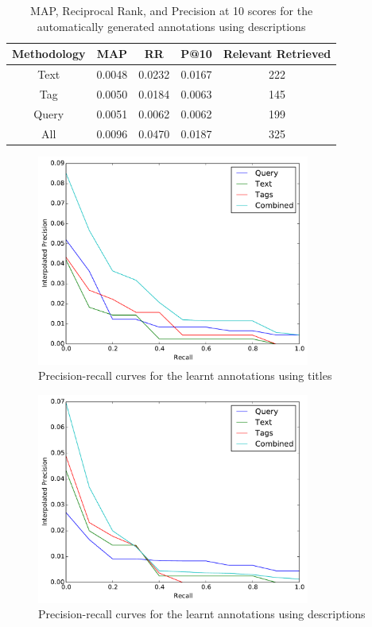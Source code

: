 \begin{table}[ht]
    \centering
    \begin{tabular}{|c|c|c|c|c|}
        \hline
         Methodology & MAP & RR & P@10 & Relevant Retrieved\\ \hline
         Text & 0.0048 & 0.0232 & 0.0167 & 222 \\ \hline
         Tag & 0.0050 & 0.0184 & 0.0063 & 145 \\ \hline
         Query & 0.0051 & 0.0062 & 0.0062 & 199 \\ \hline
         All & 0.0096 & 0.0470 & 0.0187 & 325 \\ \hline
    \end{tabular}
    \caption{MAP, Reciprocal Rank, and Precision at 10 scores for the automatically generated annotations using descriptions}
    \label{table:learnt-results-title}
\end{table}

\begin{figure}[ht]
    \centering
    \includegraphics[width=0.8\textwidth]{graphs/auto-title}
    \caption{Precision-recall curves for the learnt annotations using titles}
    \label{fig:manual-result-title}
\end{figure}

\begin{figure}[ht]
    \centering
    \includegraphics[width=0.8\textwidth]{graphs/auto-desc}
    \caption{Precision-recall curves for the learnt annotations using descriptions}
    \label{fig:manual-result-desc}
\end{figure}

